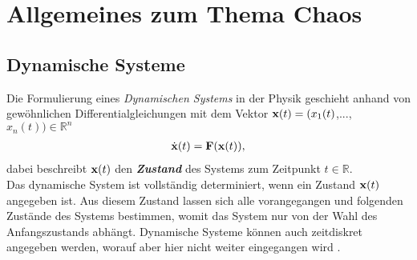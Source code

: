

\section{Allgemeines zum Thema Chaos}
\label{sec:allgemeines}

\subsection{Dynamische Systeme}
\label{sub:dynamSys}
Die Formulierung eines \textit{Dynamischen Systems} in der Physik geschieht anhand von gewöhnlichen Differentialgleichungen mit dem Vektor $\vect{x}(t)=(x_1(t)$,..., $x_n(t))\in\mathbb{R}^n$
\begin{gather}
    \dot{\vect{x}}(t)=\vect{F}(\vect{x}(t)),
    \label{eq:dynamDGL}
\end{gather}
dabei beschreibt $\vect{x}(t)$ den \textit{\textbf{Zustand}} des Systems zum Zeitpunkt $t\in\mathbb{R}$.\\
Das dynamische System ist vollständig determiniert, wenn ein Zustand $\vect{x}(t)$ angegeben ist. Aus diesem Zustand lassen sich alle vorangegangen und folgenden Zustände des Systems bestimmen, womit das System nur von der Wahl des Anfangszustands abhängt. Dynamische Systeme können auch zeitdiskret angegeben werden, worauf aber hier nicht weiter eingegangen wird \citep{Lueck}.\\

